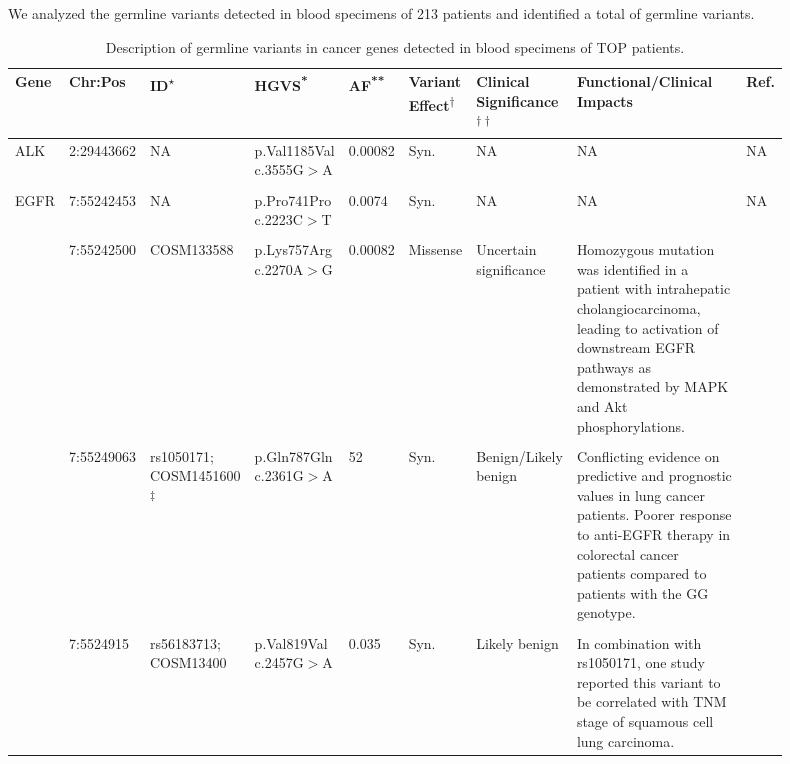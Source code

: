 We analyzed the germline variants detected in blood specimens of 213 patients and identified a total of  germline variants.




\begin{landscape}

\begin{longtable}{p{0.07\linewidth}|p{0.09\linewidth}p{0.11\linewidth}p{0.1\linewidth}p{0.05\linewidth}p{0.065\linewidth}p{0.11\linewidth}p{0.25\linewidth}p{0.05\linewidth}}
		\caption{Description of germline variants in cancer genes detected in blood specimens of TOP patients.}
    \label{tbl:germline_cancer_genes}
		\\
    \hline
    Gene & Chr:Pos & ID\textsuperscript{$\star$} & HGVS\textsuperscript{*} & AF\textsuperscript{**} & Variant Effect\textsuperscript{$\dagger$} & Clinical Significance\textsuperscript{$\dagger\dagger$} & Functional/Clinical Impacts & Ref.
		\\
    \hline
		ALK & 2:29443662 & NA & p.Val1185Val c.3555G$>$A & 0.00082 & Syn. & NA & NA & NA
		\\
		\\
		\hline
		EGFR & 7:55242453 & NA & p.Pro741Pro c.2223C$>$T & 0.0074 & Syn. & NA & NA & NA
		\\
		\\
		& 7:55242500 & COSM133588 & p.Lys757Arg c.2270A$>$G & 0.00082 & Missense & Uncertain \mbox{significance} & Homozygous mutation was identified in a patient with intrahepatic cholangiocarcinoma, leading to activation of downstream EGFR pathways as demonstrated by MAPK and Akt phosphorylations. & \cite{Leone2006}
		\\
		\\
		& 7:55249063 & rs1050171; COSM1451600\textsuperscript{$\ddagger$} & p.Gln787Gln c.2361G$>$A & 52 & Syn. & Benign/Likely benign & Conflicting evidence on predictive and prognostic values in lung cancer patients. Poorer response to anti-EGFR therapy in colorectal cancer patients compared to patients with the GG genotype. & \cite{Zhang2006a, Leichsenring2017, Wang2013, Bonin2016}
		\\
		\\
		& 7:5524915 & rs56183713; COSM13400 & p.Val819Val c.2457G$>$A & 0.035 & Syn. & Likely benign & In combination with rs1050171, one study reported this variant to be correlated with TNM stage of squamous cell lung carcinoma. & \cite{Wang2013}

\end{longtable}
\end{landscape}
